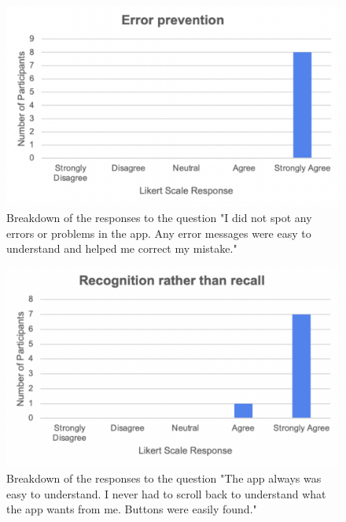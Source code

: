 \documentclass{l4proj}
\begin{document}
\begin{appendices}
\begin{figure}[H]
    \begin{centering}
    \includegraphics[scale=0.5]{images/heuristic5.pdf}
    \caption{Breakdown of the responses to the question "I did not spot any errors or problems in the app. Any error messages were easy to understand and helped me correct my mistake."}
    \label{fig: heuristic5}
    \end{centering}
\end{figure}

\begin{figure}[H]
    \begin{centering}
    \includegraphics[scale=0.5]{images/heuristic6.pdf}
    \caption{Breakdown of the responses to the question "The app always was easy to understand. I never had to scroll back to understand what the app wants from me. Buttons were easily found."}
    \label{fig: heuristic6}
    \end{centering}
\end{figure}


\end{appendices}
\end{document}
